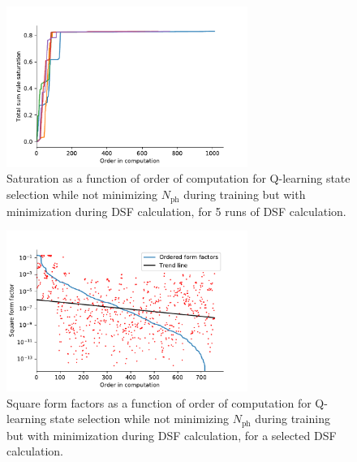 \documentclass[11pt, a4paper]{report} %
\begin{document}
\begin{figure}[tb!]
  \centering
  \includegraphics[width=0.7\textwidth]{saturation_histories_rand_False_check_train_False_check_eval_True.pdf}
  \caption{Saturation as a function of order of computation for Q-learning state selection while not minimizing \(N_{\mathrm{ph}}\) during training but with minimization during DSF calculation, for 5 runs of DSF calculation.}
  \label{fig:saturation_histories_rand_False_check_train_False_check_eval_True}
\end{figure}

\begin{figure}[tb!]
  \centering
  \includegraphics[width=0.7\textwidth]{ff_sizes_rand_False_check_train_False_check_eval_True.pdf}
  \caption{Square form factors as a function of order of computation for Q-learning state selection while not minimizing \(N_{\mathrm{ph}}\) during training but with minimization during DSF calculation, for a selected DSF calculation.}
  \label{fig:ff_sizes_rand_False_check_train_False_check_eval_True}
\end{figure}
\end{document}
